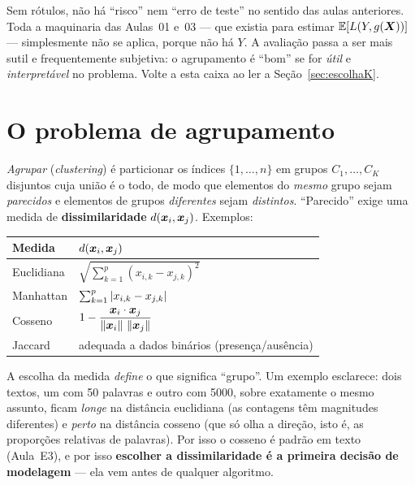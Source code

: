 \documentclass[11pt,a4paper]{article}
\begin{document}
\begin{atencao}
Sem rótulos, não há ``risco'' nem ``erro de teste'' no sentido das aulas anteriores.
Toda a maquinaria das Aulas~01 e~03 --- que existia para estimar
$\mathbb{E}[L(Y,g(\bm{X}))]$ --- simplesmente não se aplica, porque não há $Y$. A avaliação
passa a ser mais sutil e frequentemente subjetiva: o agrupamento é ``bom'' se for
\emph{útil} e \emph{interpretável} no problema. Volte a esta caixa ao ler a
Seção~\ref{sec:escolhaK}.
\end{atencao}

\section{O problema de agrupamento}
\emph{Agrupar} (\emph{clustering}) é particionar os índices $\{1,\dots,n\}$ em
grupos $C_1,\dots,C_K$ disjuntos cuja união é o todo, de modo que elementos do
\emph{mesmo} grupo sejam \emph{parecidos} e elementos de grupos \emph{diferentes}
sejam \emph{distintos}. ``Parecido'' exige uma medida de \textbf{dissimilaridade}
$d(\bm{x}_i,\bm{x}_j)$. Exemplos:
\begin{center}\small
\renewcommand{\arraystretch}{1.5}
\begin{tabular}{@{}ll@{}}
\toprule
\textbf{Medida} & \textbf{$d(\bm{x}_i,\bm{x}_j)$} \\
\midrule
Euclidiana   & $\sqrt{\sum_{k=1}^p (x_{i,k}-x_{j,k})^2}$ \\
Manhattan    & $\sum_{k=1}^p \left\lvert x_{i,k}-x_{j,k} \right\rvert$ \\
Cosseno      & $1-\dfrac{\bm{x}_i\cdot\bm{x}_j}{\left\lVert \bm{x}_i \right\rVert\,\left\lVert \bm{x}_j \right\rVert}$ \\
Jaccard      & adequada a dados binários (presença/ausência) \\
\bottomrule
\end{tabular}
\end{center}

\begin{ideia}
A escolha da medida \emph{define} o que significa ``grupo''. Um exemplo esclarece:
dois textos, um com 50 palavras e outro com 5000, sobre exatamente o mesmo assunto,
ficam \emph{longe} na distância euclidiana (as contagens têm magnitudes diferentes)
e \emph{perto} na distância cosseno (que só olha a direção, isto é, as proporções
relativas de palavras). Por isso o cosseno é padrão em texto (Aula~E3), e por isso
\textbf{escolher a dissimilaridade é a primeira decisão de modelagem} --- ela vem
antes de qualquer algoritmo.
\end{ideia}
\end{document}
